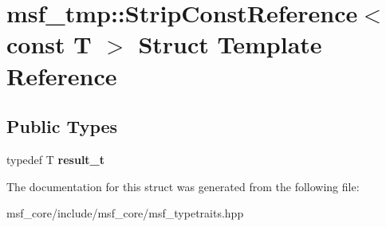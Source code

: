 \hypertarget{structmsf__tmp_1_1StripConstReference_3_01const_01T_01_4}{\section{msf\-\_\-tmp\-:\-:Strip\-Const\-Reference$<$ const T $>$ Struct Template Reference}
\label{structmsf__tmp_1_1StripConstReference_3_01const_01T_01_4}
}
\subsection*{Public Types}
\begin{DoxyCompactItemize}
\item 
\hypertarget{structmsf__tmp_1_1StripConstReference_3_01const_01T_01_4_a37e22d99853f07caf2ae4ef4455e3d16}{typedef T {\bfseries result\-\_\-t}}\label{structmsf__tmp_1_1StripConstReference_3_01const_01T_01_4_a37e22d99853f07caf2ae4ef4455e3d16}

\end{DoxyCompactItemize}


The documentation for this struct was generated from the following file\-:\begin{DoxyCompactItemize}
\item 
msf\-\_\-core/include/msf\-\_\-core/msf\-\_\-typetraits.\-hpp\end{DoxyCompactItemize}
